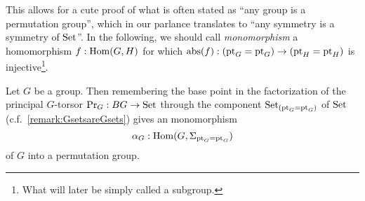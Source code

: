 This allows for a cute proof of what is often stated as ``any group is a permutation group'', which in our parlance translates to ``any symmetry is a symmetry of $\mathord{\mathrm{Set}}$''.
In the following, we should call {\em monomorphism} a homomorphism
$f:\mathrm{Hom}(G,H)$ for which $\mathrm{abs}(f):(\mathrm{pt}_G=\mathrm{pt}_G)\to(\mathrm{pt}_H=\mathrm{pt}_H)$ is
injective\footnote{What will later be simply called a subgroup.}.
\begin{lemma}
  \label{lem:allgpsarepermutationgps}Let $G$ be a group. Then
  remembering the base point in the factorization of the principal
  $G$-torsor $\mathrm{Pr}_{{G}}:BG\to\mathord{\mathrm{Set}}$ through the component
  $\mathord{\mathrm{Set}}_{(\mathrm{pt}_G=\mathrm{pt}_G)}$ of $\mathord{\mathrm{Set}}$ (c.f.~\cref{remark:GsetsareGsets})
  gives an monomorphism
  $$\alpha_G:\mathrm{Hom}(G,\Sigma_{\mathrm{pt}_G=\mathrm{pt}_G})$$  
  of $G$ into a permutation group.
\end{lemma}
